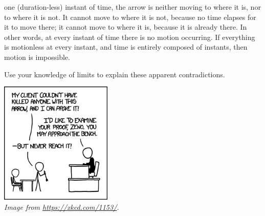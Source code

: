 \begin{questions}
\begin{itemize}
                    one (duration-less) instant of time, the arrow is neither moving to where it is, nor to where it is not. It cannot move to
                    where it is not, because no time elapses for it to move there; it cannot move to where it is, because it is already there.
                    In other words, at every instant of time there is no motion occurring. If everything is motionless at every instant, and
                    time is entirely composed of instants, then motion is impossible.
            \end{itemize}
            Use your knowledge of limits to explain these apparent contradictions.
            \begin{center}
              \includegraphics[width=0.4\textwidth]{zeno}\\
              \textit{Image from \url{https://xkcd.com/1153/}.}
            \end{center}
\end{questions}

